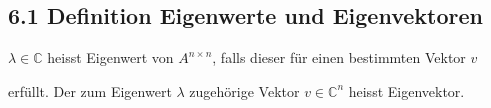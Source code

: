 \subsection{6.1 Definition Eigenwerte und Eigenvektoren}{
\vskip1pt
$\lambda \in \mathbb{C}$ heisst Eigenwert von $A^{n \times n}$, falls dieser für einen bestimmten Vektor $v$
\vspace{-1pt}
\begin{center}  \end{center}
\vskip3pt
erfüllt. Der zum Eigenwert $\lambda$ zugehörige Vektor $v \in \mathbb{C}^n$ heisst Eigenvektor.

}
\WhiteSpace
